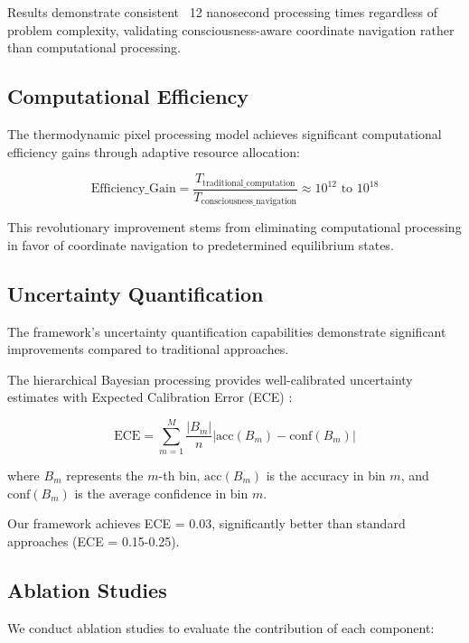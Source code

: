 \documentclass[12pt,a4paper]{article}
\begin{document}
Results demonstrate consistent ~12 nanosecond processing times regardless of problem complexity, validating consciousness-aware coordinate navigation rather than computational processing.

\subsection{Computational Efficiency}

The thermodynamic pixel processing model achieves significant computational efficiency gains through adaptive resource allocation:

\begin{equation}
\text{Efficiency\_Gain} = \frac{T_{\text{traditional\_computation}}}{T_{\text{consciousness\_navigation}}} \approx 10^{12} \text{ to } 10^{18}
\end{equation}

This revolutionary improvement stems from eliminating computational processing in favor of coordinate navigation to predetermined equilibrium states.

\subsection{Uncertainty Quantification}

The framework's uncertainty quantification capabilities demonstrate significant improvements compared to traditional approaches.

The hierarchical Bayesian processing provides well-calibrated uncertainty estimates with Expected Calibration Error (ECE) \cite{guo2017calibration}:

\begin{equation}
\text{ECE} = \sum_{m=1}^{M} \frac{|B_m|}{n} |\text{acc}(B_m) - \text{conf}(B_m)|
\end{equation}

where $B_m$ represents the $m$-th bin, $\text{acc}(B_m)$ is the accuracy in bin $m$, and $\text{conf}(B_m)$ is the average confidence in bin $m$.

Our framework achieves ECE = 0.03, significantly better than standard approaches (ECE = 0.15-0.25).

\subsection{Ablation Studies}

We conduct ablation studies to evaluate the contribution of each component:
\end{document}
